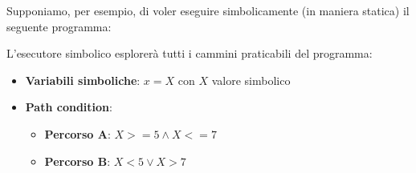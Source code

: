 \documentclass[../main.tex]{subfiles}
\begin{document}
Supponiamo, per esempio, di voler eseguire simbolicamente (in maniera statica) il seguente programma:

L'esecutore simbolico esplorerà tutti i cammini praticabili del programma:
\begin{itemize}
    \item \textbf{Variabili simboliche}: $x = X$ con $X$ valore simbolico
    \item \textbf{Path condition}:
    \begin{itemize}
        \item \textbf{Percorso A}: $X >= 5 \land X <= 7$
        \item \textbf{Percorso B}: $X < 5 \vee X > 7$
    \end{itemize}
\end{itemize}
\end{document}
